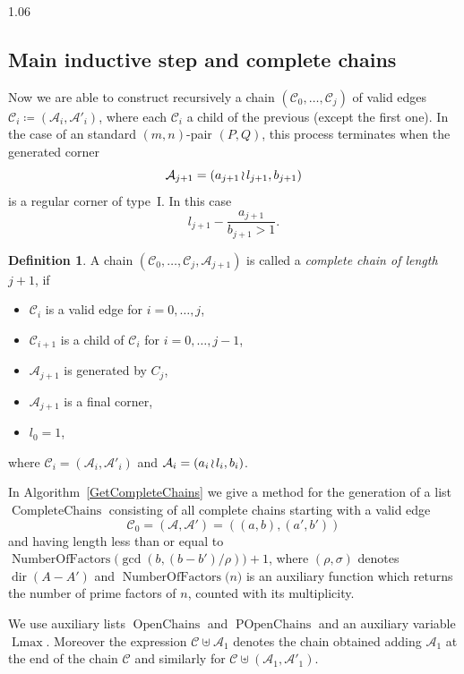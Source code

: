 \documentclass[reqno,a4paper,twoside]{amsart}
\theoremstyle{definition}
\newtheorem{definition}[theorem]{Definition}
\theoremstyle{remark}
\DeclareMathOperator{\NumberOfFactors}{NumberOfFactors}
\DeclareMathOperator{\dir}{dir}
\DeclareMathOperator{\Lmax}{Lmax}
\DeclareMathOperator{\CompleteChains}{CompleteChains}
\DeclareMathOperator{\OpenChains}{OpenChains}
\DeclareMathOperator{\POpenChains}{POpenChains}
\newcommand{\wrs}{\hspace{-0.9pt}\wr\hspace{-0.9pt}}
\begin{document}
\begin{spacing}{1.06}
\subsection{Main inductive step and complete chains}

Now we are able to construct recursively a chain $(\mathcal{C}_0,\dots,\mathcal{C}_j)$ of valid edges $\mathcal{C}_i\coloneqq (\mathcal{A}_i,\mathcal{A}'_i)$, where each $\mathcal{C}_i$ a child of the previous (except the first one). In the case of an standard $(m,n)$-pair $(P,Q)$, this process terminates when the generated corner
$$
\mathcal{A}_{j+1} = (a_{j+1}\wrs l_{j+1},b_{j+1})
$$
is a regular corner of type~I. In this case
$$
l_{j+1}-\frac{a_{j+1}}{b_{j+1}>1}.
$$

\begin{definition}\label{complete chain}
A chain $(\mathcal{C}_0,\dots,\mathcal{C}_j,\mathcal{A}_{j+1})$ is called a {\em complete chain of length~$j+1$}, if
\begin{itemize}[itemsep=0.5ex,topsep=0.5ex]

\item[-] $\mathcal{C}_i$ is a valid edge for $i=0,\dots,j$,

\item[-] $\mathcal{C}_{i+1}$ is a child of $\mathcal{C}_i$ for $i=0,\dots,j-1$,

\item[-] $\mathcal{A}_{j+1}$ is generated by $C_j$,

\item[-] $\mathcal{A}_{j+1}$ is a final corner,

\item[-] $l_0=1$,

\end{itemize}
where $\mathcal{C}_i=(\mathcal{A}_i,\mathcal{A}'_i)$ and $\mathcal{A}_i=(a_i\wrs l_i,b_i)$.
\end{definition}


In Algorithm~\ref{GetCompleteChains} we give a method for the generation of a list $\CompleteChains$ consisting of all complete chains starting with a valid edge
$$
\mathcal{C}_0 = (\mathcal{A},\mathcal{A}') = ((a,b),(a',b'))
$$
and having length less than or equal to $\NumberOfFactors\bigl(\gcd(b,(b-b')/\rho)\bigr)+1$, where $(\rho,\sigma)$ denotes $\dir(A-A')$ and $\NumberOfFactors \bigl(n)$ is an auxiliary function which returns the number of prime factors of $n$, counted with its multiplicity.

We use auxiliary lists $\OpenChains$ and $\POpenChains$ and an auxiliary variable $\Lmax$. Moreover the expression $\mathscr{C}\uplus \mathcal{A}_1$ denotes the chain obtained adding $\mathcal{A}_1$ at the end of the chain $\mathscr{C}$ and similarly for $\mathscr{C}\uplus (\mathcal{A}_1,\mathcal{A}'_1)$.

\end{spacing}
\end{document}
